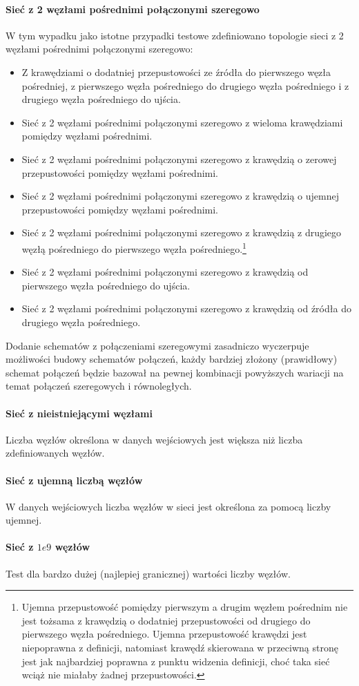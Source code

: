 \paragraph{Sieć z 2 węzłami pośrednimi połączonymi szeregowo}
W tym wypadku jako istotne przypadki testowe zdefiniowano topologie
sieci z 2 węzłami pośrednimi połączonymi szeregowo:
\begin{itemize}[nosep]
    \item Z krawędziami o dodatniej przepustowości ze źródła do pierwszego węzła
    pośredniej, z pierwszego węzła pośredniego do drugiego węzła pośredniego i z
    drugiego węzła pośredniego do ujścia.
    \item Sieć z 2 węzłami pośrednimi połączonymi szeregowo z wieloma
    krawędziami pomiędzy węzłami pośrednimi.
    \item Sieć z 2 węzłami pośrednimi połączonymi szeregowo z krawędzią o
    zerowej przepustowości pomiędzy węzłami pośrednimi.
    \item Sieć z 2 węzłami pośrednimi połączonymi szeregowo z krawędzią o
    ujemnej przepustowości pomiędzy węzłami pośrednimi.
    \item Sieć z 2 węzłami pośrednimi połączonymi szeregowo z krawędzią z
    drugiego węzłą pośredniego do pierwszego węzła pośredniego.\footnote{Ujemna
    przepustowość pomiędzy pierwszym a drugim węzłem pośrednim nie jest tożsama
    z krawędzią o dodatniej przepustowości od drugiego do pierwszego węzła
    pośredniego. Ujemna przepustowość krawędzi jest niepoprawna z definicji,
    natomiast krawędź skierowana w przeciwną stronę jest jak najbardziej
    poprawna z punktu widzenia definicji, choć taka sieć wciąż nie miałaby
    żadnej przepustowości.}
    \item Sieć z 2 węzłami pośrednimi połączonymi szeregowo z krawędzią od
    pierwszego węzła pośredniego do ujścia.
    \item Sieć z 2 węzłami pośrednimi połączonymi szeregowo z krawędzią od
    źródła do drugiego węzła pośredniego.
\end{itemize}
Dodanie schematów z połączeniami szeregowymi zasadniczo wyczerpuje możliwości
budowy schematów połączeń, każdy bardziej złożony (prawidłowy) schemat połączeń
będzie bazował na pewnej kombinacji powyższych wariacji na temat połączeń
szeregowych i równoległych.

\paragraph{Sieć z nieistniejącymi węzłami}
Liczba węzłów określona w danych wejściowych jest większa niż liczba
zdefiniowanych węzłów.

\paragraph{Sieć z ujemną liczbą węzłów}
W danych wejściowych liczba węzłów w sieci jest określona za pomocą liczby
ujemnej.

\paragraph{Sieć z $1e9$ węzłów}
Test dla bardzo dużej (najlepiej granicznej) wartości liczby węzłów.
